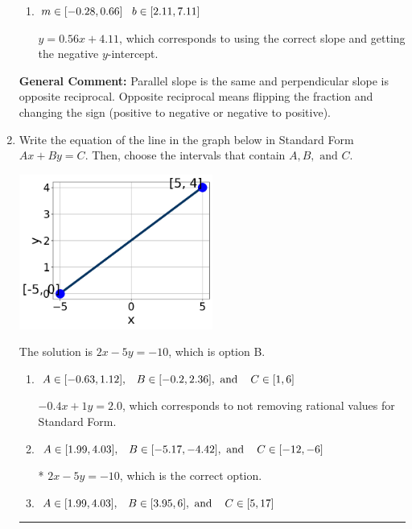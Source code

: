 \documentclass{extbook}[14pt]
\newcommand{\litem}[1]{\item #1

\rule{\textwidth}{0.4pt}}
\begin{document}
\begin{enumerate}
{\begin{enumerate}[label=\Alph*.]
 $y = 1.80x - 4.11$, which corresponds to using the reciprocal slope $(1/m)$.
\item \( m \in [-0.28, 0.66] \hspace*{3mm} b \in [2.11, 7.11] \)

 $y = 0.56x + 4.11$, which corresponds to using the correct slope and getting the negative $y$-intercept.
\end{enumerate}

\textbf{General Comment:} Parallel slope is the same and perpendicular slope is opposite reciprocal. Opposite reciprocal means flipping the fraction and changing the sign (positive to negative or negative to positive).
}
\litem{
Write the equation of the line in the graph below in Standard Form $Ax+By=C$. Then, choose the intervals that contain $A, B, \text{ and } C$.

\begin{center}
    \includegraphics[width=0.5\textwidth]{../Figures/linearGraphToStandardC.png}
\end{center}


The solution is \( 2x - 5y = -10 \), which is option B.\begin{enumerate}[label=\Alph*.]
\item \( A \in [-0.63, 1.12], \hspace{3mm} B \in [-0.2, 2.36], \text{ and } \hspace{3mm} C \in [1, 6] \)

 $-0.4x + 1y = 2.0$, which corresponds to not removing rational values for Standard Form.
\item \( A \in [1.99, 4.03], \hspace{3mm} B \in [-5.17, -4.42], \text{ and } \hspace{3mm} C \in [-12, -6] \)

* $2x - 5y = -10$, which is the correct option.
\item \( A \in [1.99, 4.03], \hspace{3mm} B \in [3.95, 6], \text{ and } \hspace{3mm} C \in [5, 17] \)


\end{enumerate}}
\end{enumerate}
\end{document}
